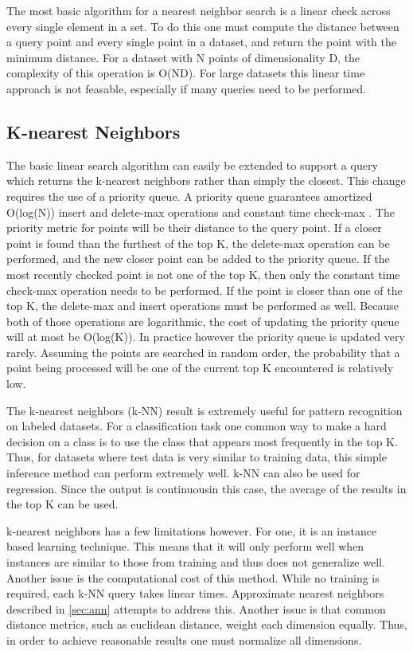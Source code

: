 The most basic algorithm for a nearest neighbor search is a linear check across every single element in a set.  To do this one must compute the distance between a query point and every single point in a dataset, and return the point with the minimum distance.  For a dataset with N points of dimensionality D, the complexity of this operation is O(ND).  For large datasets this linear time approach is not feasable, especially if many queries need to be performed.

\subsection{K-nearest Neighbors}
\label{subsec:knn}

The basic linear search algorithm can easily be extended to support a query which returns the k-nearest neighbors rather than simply the closest.  This change requires the use of a priority queue.  A priority queue guarantees amortized O(log(N)) insert and delete-max operations and constant time check-max \citep{van1976design}.  The priority metric for points will be their distance to the query point.  If a closer point is found than the furthest of the top K, the delete-max operation can be performed, and the new closer point can be added to the priority queue.  If the most recently checked point is not one of the top K, then only the constant time check-max operation needs to be performed.  If the point is closer than one of the top K, the delete-max and insert operations must be performed as well.  Because both of those operations are logarithmic, the cost of updating the priority queue will at most be O(log(K)).  In practice however the priority queue is updated very rarely.  Assuming the points are searched in random order, the probability that a point being processed will be one of the current top K encountered is relatively low.

The k-nearest neighbors (k-NN) result is extremely useful for pattern recognition on labeled datasets.  For a classification task one common way to make a hard decision on a class is to use the class that appears most frequently in the top K.  Thus, for datasets where test data is very similar to training data, this simple inference method can perform extremely well.  k-NN can also be used for regression.  Since the output is continuousin this case, the average of the results in the top K can be used.

k-nearest neighbors has a few limitations however.  For one, it is an instance based learning technique.  This means that it will only perform well when instances are similar to those from training and thus does not generalize well.  Another issue is the computational cost of this method.  While no training is required, each k-NN query takes linear times.  Approximate nearest neighbors described in \ref{sec:ann} attempts to address this.  Another issue is that common distance metrics, such as euclidean distance, weight each dimension equally.  Thus, in order to achieve reasonable results one must normalize all dimensions.

